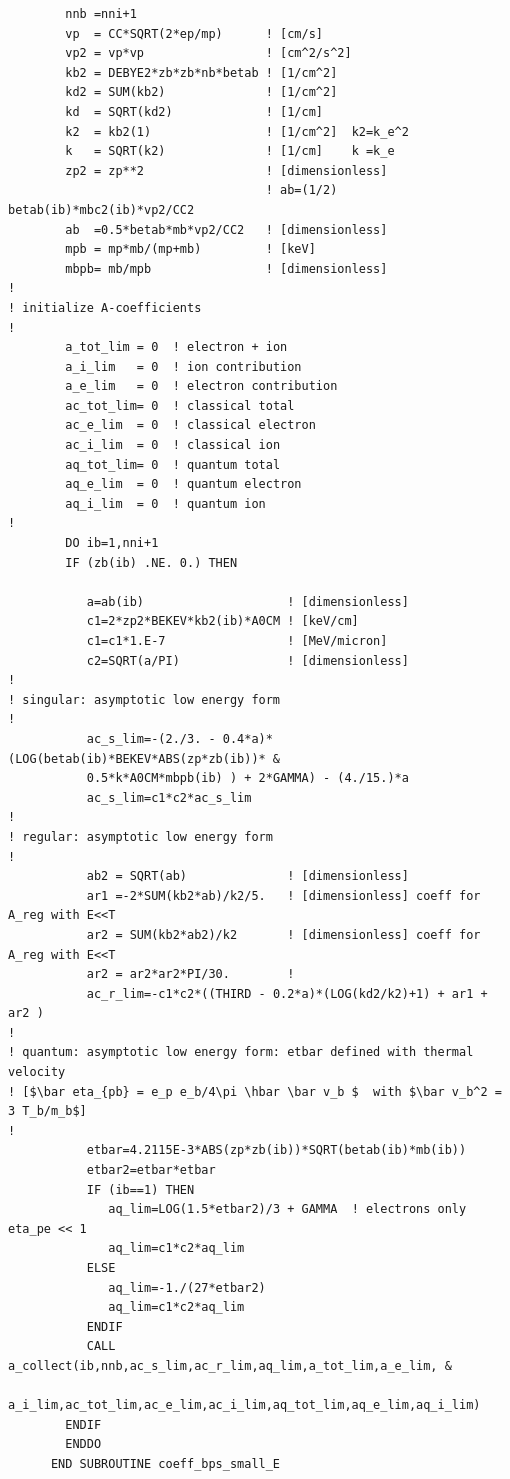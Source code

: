 \documentclass[preprint,12pt,eqsecnum,nofootinbib,amsmath,amssymb]{revtex4}
\begin{document}
{\begin{verbatim}
        nnb =nni+1
        vp  = CC*SQRT(2*ep/mp)      ! [cm/s]
        vp2 = vp*vp                 ! [cm^2/s^2]
        kb2 = DEBYE2*zb*zb*nb*betab ! [1/cm^2]
        kd2 = SUM(kb2)              ! [1/cm^2]
        kd  = SQRT(kd2)             ! [1/cm]
        k2  = kb2(1)                ! [1/cm^2]  k2=k_e^2
        k   = SQRT(k2)              ! [1/cm]    k =k_e
        zp2 = zp**2                 ! [dimensionless]
                                    ! ab=(1/2) betab(ib)*mbc2(ib)*vp2/CC2
        ab  =0.5*betab*mb*vp2/CC2   ! [dimensionless] 
        mpb = mp*mb/(mp+mb)         ! [keV]
        mbpb= mb/mpb                ! [dimensionless]
!
! initialize A-coefficients
!
        a_tot_lim = 0  ! electron + ion
        a_i_lim   = 0  ! ion contribution
        a_e_lim   = 0  ! electron contribution
        ac_tot_lim= 0  ! classical total
        ac_e_lim  = 0  ! classical electron
        ac_i_lim  = 0  ! classical ion
        aq_tot_lim= 0  ! quantum total
        aq_e_lim  = 0  ! quantum electron
        aq_i_lim  = 0  ! quantum ion
!
        DO ib=1,nni+1
        IF (zb(ib) .NE. 0.) THEN

           a=ab(ib)                    ! [dimensionless] 
           c1=2*zp2*BEKEV*kb2(ib)*A0CM ! [keV/cm]
           c1=c1*1.E-7                 ! [MeV/micron]
           c2=SQRT(a/PI)               ! [dimensionless] 
!
! singular: asymptotic low energy form
!
           ac_s_lim=-(2./3. - 0.4*a)*(LOG(betab(ib)*BEKEV*ABS(zp*zb(ib))* &
           0.5*k*A0CM*mbpb(ib) ) + 2*GAMMA) - (4./15.)*a
           ac_s_lim=c1*c2*ac_s_lim
!
! regular: asymptotic low energy form
!
           ab2 = SQRT(ab)              ! [dimensionless]
           ar1 =-2*SUM(kb2*ab)/k2/5.   ! [dimensionless] coeff for A_reg with E<<T
           ar2 = SUM(kb2*ab2)/k2       ! [dimensionless] coeff for A_reg with E<<T
           ar2 = ar2*ar2*PI/30.        !
           ac_r_lim=-c1*c2*((THIRD - 0.2*a)*(LOG(kd2/k2)+1) + ar1 + ar2 )
!
! quantum: asymptotic low energy form: etbar defined with thermal velocity
! [$\bar eta_{pb} = e_p e_b/4\pi \hbar \bar v_b $  with $\bar v_b^2 = 3 T_b/m_b$]
!
           etbar=4.2115E-3*ABS(zp*zb(ib))*SQRT(betab(ib)*mb(ib))
           etbar2=etbar*etbar
           IF (ib==1) THEN
              aq_lim=LOG(1.5*etbar2)/3 + GAMMA  ! electrons only eta_pe << 1
              aq_lim=c1*c2*aq_lim
           ELSE
              aq_lim=-1./(27*etbar2)
              aq_lim=c1*c2*aq_lim
           ENDIF
           CALL a_collect(ib,nnb,ac_s_lim,ac_r_lim,aq_lim,a_tot_lim,a_e_lim, &
             a_i_lim,ac_tot_lim,ac_e_lim,ac_i_lim,aq_tot_lim,aq_e_lim,aq_i_lim)
        ENDIF
        ENDDO
      END SUBROUTINE coeff_bps_small_E
\end{verbatim}


}
\end{document}
